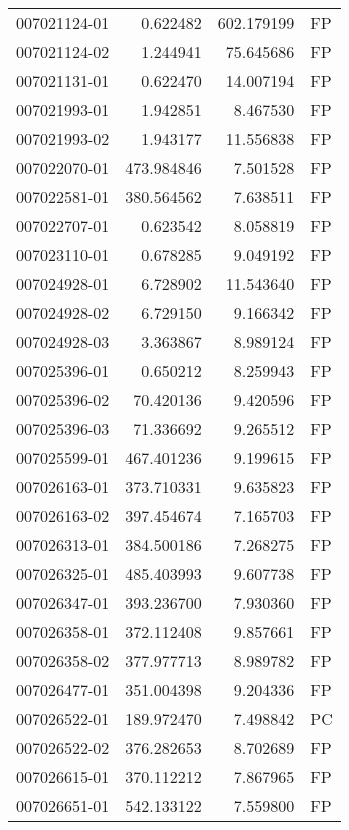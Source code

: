 \begin{tabular}{lrrl}
007021124-01 &    0.622482 &     602.179199 &   FP \\
007021124-02 &    1.244941 &      75.645686 &   FP \\
007021131-01 &    0.622470 &      14.007194 &   FP \\
007021993-01 &    1.942851 &       8.467530 &   FP \\
007021993-02 &    1.943177 &      11.556838 &   FP \\
007022070-01 &  473.984846 &       7.501528 &   FP \\
007022581-01 &  380.564562 &       7.638511 &   FP \\
007022707-01 &    0.623542 &       8.058819 &   FP \\
007023110-01 &    0.678285 &       9.049192 &   FP \\
007024928-01 &    6.728902 &      11.543640 &   FP \\
007024928-02 &    6.729150 &       9.166342 &   FP \\
007024928-03 &    3.363867 &       8.989124 &   FP \\
007025396-01 &    0.650212 &       8.259943 &   FP \\
007025396-02 &   70.420136 &       9.420596 &   FP \\
007025396-03 &   71.336692 &       9.265512 &   FP \\
007025599-01 &  467.401236 &       9.199615 &   FP \\
007026163-01 &  373.710331 &       9.635823 &   FP \\
007026163-02 &  397.454674 &       7.165703 &   FP \\
007026313-01 &  384.500186 &       7.268275 &   FP \\
007026325-01 &  485.403993 &       9.607738 &   FP \\
007026347-01 &  393.236700 &       7.930360 &   FP \\
007026358-01 &  372.112408 &       9.857661 &   FP \\
007026358-02 &  377.977713 &       8.989782 &   FP \\
007026477-01 &  351.004398 &       9.204336 &   FP \\
007026522-01 &  189.972470 &       7.498842 &   PC \\
007026522-02 &  376.282653 &       8.702689 &   FP \\
007026615-01 &  370.112212 &       7.867965 &   FP \\
007026651-01 &  542.133122 &       7.559800 &   FP \\

\end{tabular}
